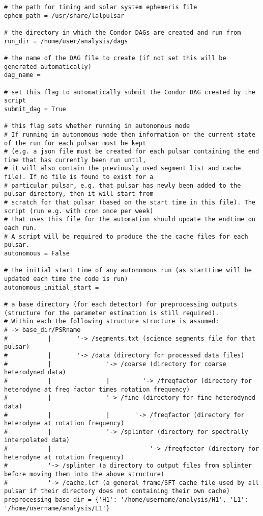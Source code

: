 \begin{lstlisting}[frame=single,basicstyle=\tiny\ttfamily]
# the path for timing and solar system ephemeris file
ephem_path = /usr/share/lalpulsar

# the directory in which the Condor DAGs are created and run from
run_dir = /home/user/analysis/dags

# the name of the DAG file to create (if not set this will be generated automatically)
dag_name =

# set this flag to automatically submit the Condor DAG created by the script
submit_dag = True

# this flag sets whether running in autonomous mode
# If running in autonomous mode then information on the current state of the run for each pulsar must be kept
# (e.g. a json file must be created for each pulsar containing the end time that has currently been run until,
# it will also contain the previously used segment list and cache file). If no file is found to exist for a
# particular pulsar, e.g. that pulsar has newly been added to the pulsar directory, then it will start from
# scratch for that pulsar (based on the start time in this file). The script (run e.g. with cron once per week)
# that uses this file for the automation should update the endtime on each run.
# A script will be required to produce the the cache files for each pulsar.
autonomous = False

# the initial start time of any autonomous run (as starttime will be updated each time the code is run)
autonomous_initial_start =

# a base directory (for each detector) for preprocessing outputs (structure for the parameter estimation is still required).
# Within each the following structure structure is assumed:
# -> base_dir/PSRname
#           |       '-> /segments.txt (science segments file for that pulsar)
#           |       '-> /data (directory for processed data files)
#           |               '-> /coarse (directory for coarse heterodyned data)
#           |               |         '-> /freqfactor (directory for heterodyne at freq factor times rotation frequency)
#           |               '-> /fine (directory for fine heterodyned data)
#           |               |       '-> /freqfactor (directory for heterodyne at rotation frequency)
#           |               '-> /splinter (directory for spectrally interpolated data)
#           |                           '-> /freqfactor (directory for heterodyne at rotation frequency)
#           '-> /splinter (a directory to output files from splinter before moving them into the above structure)
#           '-> /cache.lcf (a general frame/SFT cache file used by all pulsar if their directory does not containing their own cache)
preprocessing_base_dir = {'H1': '/home/username/analysis/H1', 'L1': '/home/username/analysis/L1'}


\end{lstlisting}
